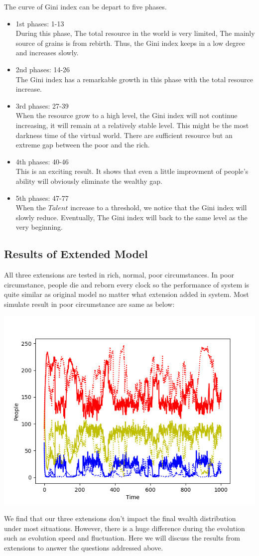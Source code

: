 The curve of Gini index can be depart to five phases.
\begin{itemize}
	\item 1st phases: 1-13\\
	During this phase, The total resource in the world is very limited, The mainly source of grains is from rebirth. Thus, the Gini index keeps in a low degree and increases slowly.
	\item 2nd phases: 14-26\\
	The Gini index has a remarkable growth in this phase with the total resource increase.
	\item 3rd phases: 27-39\\
	When the resource grow to a high level, the Gini index will not continue increasing, it will remain at a relatively stable level. This might be the most darkness time of the virtual world. There are sufficient resource but an extreme gap between the poor and the rich.
	\item 4th phases: 40-46\\
	This is an exciting result. It shows that even a little improvment of people's ability will obviously eliminate the wealthy gap.
	\item 5th phases: 47-77\\
	When the $Talent$ increase to a threshold, we notice that the Gini index will slowly reduce. Eventually, The Gini index will back to the same level as the very beginning.
\end{itemize}
\subsection{Results of Extended Model}
All three extensions are tested in rich, normal, poor circumstances.  In poor circumstance,  people die and reborn every clock so the performance of system is quite similar as original model no matter what extension added in system. Most simulate result in poor circumstance are same as below: 
\begin{center}
	\includegraphics[scale=0.6]{poor.png}
\end{center}
We find that our three extensions don't impact the final wealth distribution under most situations. However, there is a huge difference during the evolution such as evolution speed and fluctuation. Here we will discuss the results from extensions to answer the questions addressed above. 

